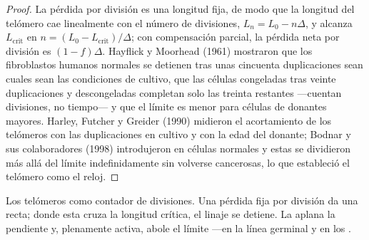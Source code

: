 \begin{proof}
La pérdida por división es una longitud fija, de modo que la longitud
del telómero cae linealmente con el número de divisiones,
$L_{n} = L_{0} - n\Delta$, y alcanza $L_{\text{crit}}$ en
$n = (L_{0} - L_{\text{crit}})/\Delta$; con compensación parcial, la
pérdida neta por división es $(1 - f)\Delta$. Hayflick y Moorhead
(1961) mostraron que los fibroblastos humanos normales se detienen tras
unas cincuenta duplicaciones sean cuales sean las condiciones de
cultivo, que las células congeladas tras veinte duplicaciones y
descongeladas completan solo las treinta restantes ---cuentan
divisiones, no tiempo--- y que el límite es menor para células de
donantes mayores. Harley, Futcher y Greider (1990) midieron el
acortamiento de los telómeros con las duplicaciones en cultivo y con la
edad del donante; Bodnar y sus colaboradores (1998) introdujeron
 en células normales y estas se dividieron más allá del
límite indefinidamente sin volverse cancerosas, lo que estableció el
telómero como el reloj.
\end{proof}

\begin{omfigure}

{\small Los telómeros como contador de divisiones. Una pérdida fija por
división da una recta; donde esta cruza la longitud crítica, el linaje
se detiene. La  aplana la pendiente y, plenamente activa,
abole el límite ---en la línea germinal y en los .}
\end{omfigure}

